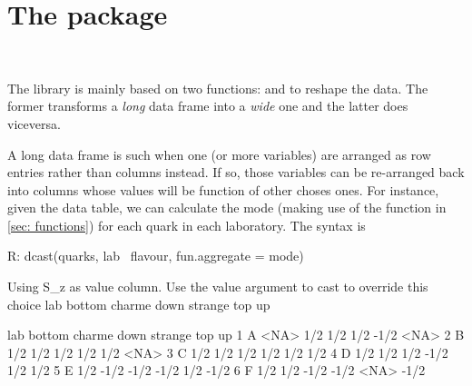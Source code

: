 \section{The  package}\label{sec: reshape2}
\\
\bigskip 

The library  is mainly based on 
two functions:  and  to
reshape the data. The former transforms a \emph{long}
data frame into a \emph{wide} one and the latter
does viceversa.
\bigskip

A long data frame is such when one (or more variables)
are arranged as row entries rather than columns instead.
If so, those variables can be re-arranged back into 
columns whose values will be function of other choses ones.
For instance, given the  data table, we can
calculate the mode (making use of the function in 
\ref{sec: functions}) for each quark in each laboratory.
The syntax is 
\begin{example}
R: dcast(quarks, lab ~flavour,  fun.aggregate = mode)
   
   Using S_z as value column.  Use the value argument 
   to cast to override this choice lab bottom charme 
   down strange  top   up

   lab bottom charme down strange  top   up
1   A   <NA>    1/2  1/2     1/2 -1/2 <NA>
2   B    1/2    1/2  1/2     1/2  1/2 <NA>
3   C    1/2    1/2  1/2     1/2  1/2  1/2
4   D    1/2    1/2  1/2    -1/2  1/2  1/2
5   E    1/2   -1/2 -1/2    -1/2  1/2 -1/2
6   F    1/2    1/2 -1/2    -1/2 <NA> -1/2
\end{example}

